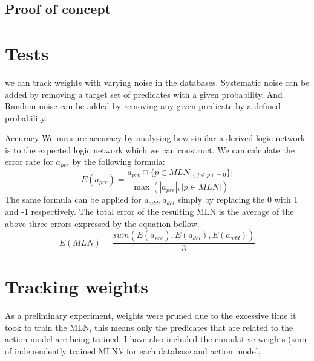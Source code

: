 \subsection{Proof of concept}
\section{Tests}
we can track weights with varying noise in the databases. Systematic noise can be added by removing a target set of predicates with a given probability. And Random noise can be added by removing any given predicate by a defined probability.

Accuracy
We measure accuracy by analysing how similar a derived logic network is to the expected logic network which we can construct. We can calculate the error rate for \(a_{pre}\) by the following formula:
\[E(a_{pre})=\frac{a_{pre}\cap \{p\in MLN_{|(f\in p) =0}\}|}{\max( |a_{pre}|,|p\in MLN|)}\]
The same formula can be applied for \(a_{add},a_{del}\) simply by replacing the 0 with 1 and -1 respectively. The total error of the resulting MLN is the average of the above three errors expressed by the equation bellow.
\[E(MLN)=\frac{sum(E(a_{pre}),E(a_{del}),E(a_{add}))}{3}\]

\section{Tracking weights}
As a preliminary experiment, weights were pruned due to the excessive time it took to train the MLN, this means only the predicates that are related to the action model are being trained.
I have also included the cumulative weights (sum of independently trained MLN's for each database and action model.



